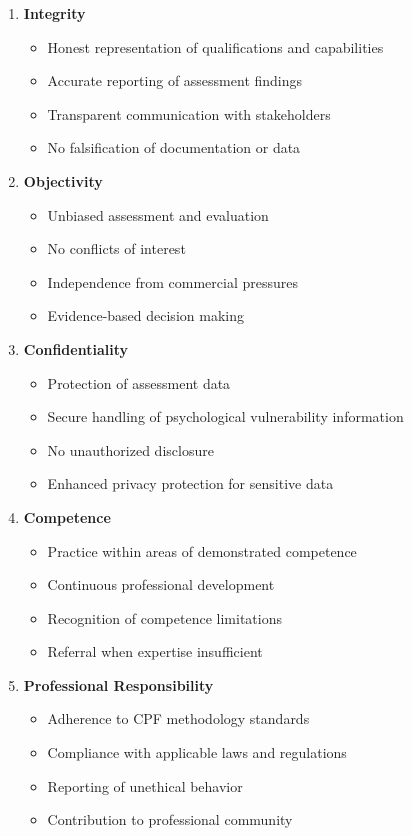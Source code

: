 \documentclass[11pt,a4paper]{article}
\begin{document}
\begin{enumerate}
\item \textbf{Integrity}
\begin{itemize}
\item Honest representation of qualifications and capabilities
\item Accurate reporting of assessment findings
\item Transparent communication with stakeholders
\item No falsification of documentation or data
\end{itemize}

\item \textbf{Objectivity}
\begin{itemize}
\item Unbiased assessment and evaluation
\item No conflicts of interest
\item Independence from commercial pressures
\item Evidence-based decision making
\end{itemize}

\item \textbf{Confidentiality}
\begin{itemize}
\item Protection of assessment data
\item Secure handling of psychological vulnerability information
\item No unauthorized disclosure
\item Enhanced privacy protection for sensitive data
\end{itemize}

\item \textbf{Competence}
\begin{itemize}
\item Practice within areas of demonstrated competence
\item Continuous professional development
\item Recognition of competence limitations
\item Referral when expertise insufficient
\end{itemize}

\item \textbf{Professional Responsibility}
\begin{itemize}
\item Adherence to CPF methodology standards
\item Compliance with applicable laws and regulations
\item Reporting of unethical behavior
\item Contribution to professional community
\end{itemize}
\end{enumerate}
\end{document}
